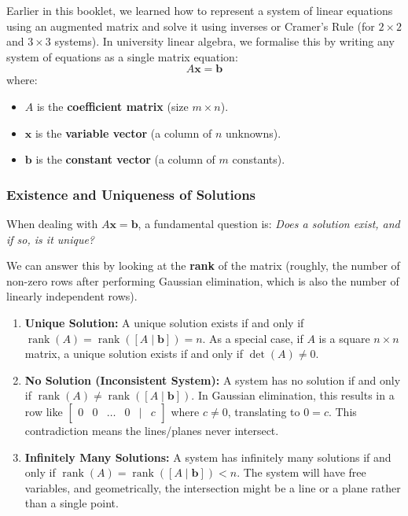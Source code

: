 

Earlier in this booklet, we learned how to represent a system of linear equations using an augmented matrix and solve it using inverses or Cramer's Rule (for $2 \times 2$ and $3 \times 3$ systems). In university linear algebra, we formalise this by writing any system of equations as a single matrix equation:
\[ A\mathbf{x} = \mathbf{b} \]
where:
\begin{itemize}[leftmargin=*]
    \item $A$ is the \textbf{coefficient matrix} (size $m \times n$).
    \item $\mathbf{x}$ is the \textbf{variable vector} (a column of $n$ unknowns).
    \item $\mathbf{b}$ is the \textbf{constant vector} (a column of $m$ constants).
\end{itemize}

\subsubsection*{Existence and Uniqueness of Solutions}

When dealing with $A\mathbf{x} = \mathbf{b}$, a fundamental question is: \emph{Does a solution exist, and if so, is it unique?}

We can answer this by looking at the \textbf{rank} of the matrix (roughly, the number of non-zero rows after performing Gaussian elimination, which is also the number of linearly independent rows).

\begin{enumerate}
    \item \textbf{Unique Solution:} A unique solution exists if and only if $\operatorname{rank}(A) = \operatorname{rank}([A \mid \mathbf{b}]) = n$. As a special case, if $A$ is a square $n \times n$ matrix, a unique solution exists if and only if $\det(A) \neq 0$.
    \item \textbf{No Solution (Inconsistent System):} A system has no solution if and only if $\operatorname{rank}(A) \neq \operatorname{rank}([A \mid \mathbf{b}])$. In Gaussian elimination, this results in a row like $\begin{bmatrix} 0 & 0 & \dots & 0 & | & c \end{bmatrix}$ where $c \neq 0$, translating to $0 = c$. This contradiction means the lines/planes never intersect.
    \item \textbf{Infinitely Many Solutions:} A system has infinitely many solutions if and only if $\operatorname{rank}(A) = \operatorname{rank}([A \mid \mathbf{b}]) < n$. The system will have free variables, and geometrically, the intersection might be a line or a plane rather than a single point.
\end{enumerate}

